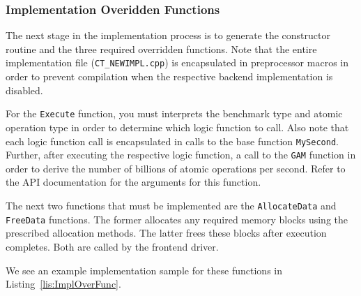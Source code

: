 \documentclass{article}
\begin{document}
\clearpage
\subsubsection{Implementation Overidden Functions}

The next stage in the implementation process is to generate the constructor routine 
and the three required overridden functions.  Note that the entire implementation 
file (\texttt{CT\_NEWIMPL.cpp}) is encapsulated in preprocessor macros in order to prevent 
compilation when the respective backend implementation is disabled.  

For the \texttt{Execute} function, you must interprets the benchmark type and atomic operation type 
in order to determine which logic function to call.  Also note that each logic function call is encapsulated 
in calls to the base function \texttt{MySecond}.  Further, after executing the respective logic function, a call 
to the \texttt{GAM} function in order to derive the number of billions of atomic operations per second.  Refer to 
the API documentation for the arguments for this function.  

The next two functions that must be implemented are the \texttt{AllocateData} and \texttt{FreeData} functions.  
The former allocates any required memory blocks using the prescribed allocation methods.  The latter frees these 
blocks after execution completes.  Both are called by the frontend driver.  

We see an example implementation sample for these functions in Listing~\ref{lis:ImplOverFunc}.  
\end{document}
